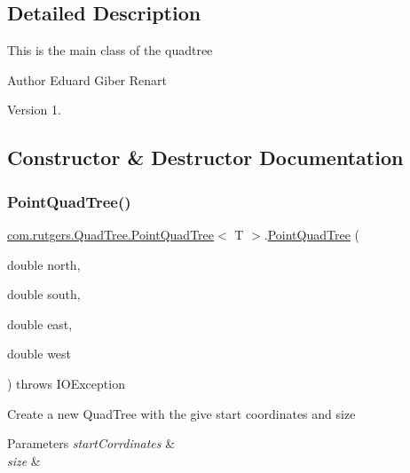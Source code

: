 \subsection{Detailed Description}
This is the main class of the quadtree

\begin{DoxyAuthor}{Author}
Eduard Giber Renart 
\end{DoxyAuthor}
\begin{DoxyVersion}{Version}
1. 
\end{DoxyVersion}


\subsection{Constructor \& Destructor Documentation}
\mbox{\label{classcom_1_1rutgers_1_1QuadTree_1_1PointQuadTree_a0f0ff8a241617971f6e96d2e2ffe9a1f}} 
\subsubsection{\texorpdfstring{Point\+Quad\+Tree()}{PointQuadTree()}}
{\footnotesize\ttfamily \hyperlink{classcom_1_1rutgers_1_1QuadTree_1_1PointQuadTree}{com.\+rutgers.\+Quad\+Tree.\+Point\+Quad\+Tree}$<$ T $>$.\hyperlink{classcom_1_1rutgers_1_1QuadTree_1_1PointQuadTree}{Point\+Quad\+Tree} (\begin{DoxyParamCaption}\item[{double}]{north,  }\item[{double}]{south,  }\item[{double}]{east,  }\item[{double}]{west }\end{DoxyParamCaption}) throws I\+O\+Exception}

Create a new Quad\+Tree with the give start coordinates and size


\begin{DoxyParams}{Parameters}
{\em start\+Corrdinates} & \\
\hline
{\em size} & \\
\hline
\end{DoxyParams}


